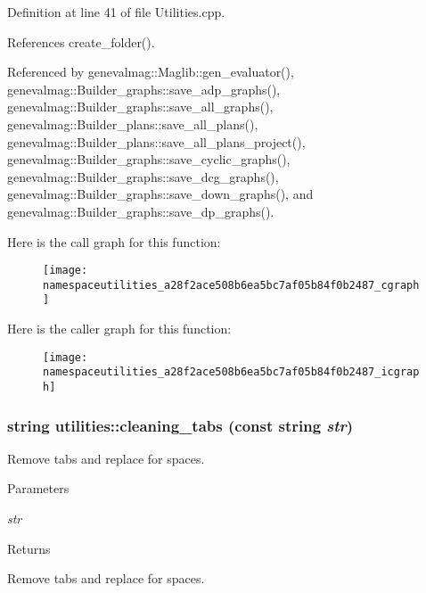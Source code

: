 Definition at line 41 of file Utilities.cpp.



References create\_\-folder().



Referenced by genevalmag::Maglib::gen\_\-evaluator(), genevalmag::Builder\_\-graphs::save\_\-adp\_\-graphs(), genevalmag::Builder\_\-graphs::save\_\-all\_\-graphs(), genevalmag::Builder\_\-plans::save\_\-all\_\-plans(), genevalmag::Builder\_\-plans::save\_\-all\_\-plans\_\-project(), genevalmag::Builder\_\-graphs::save\_\-cyclic\_\-graphs(), genevalmag::Builder\_\-graphs::save\_\-dcg\_\-graphs(), genevalmag::Builder\_\-graphs::save\_\-down\_\-graphs(), and genevalmag::Builder\_\-graphs::save\_\-dp\_\-graphs().



Here is the call graph for this function:\nopagebreak
\begin{figure}[H]
\begin{center}
\leavevmode
\texttt{[image: namespaceutilities\_a28f2ace508b6ea5bc7af05b84f0b2487\_cgraph]}
\end{center}
\end{figure}




Here is the caller graph for this function:\nopagebreak
\begin{figure}[H]
\begin{center}
\leavevmode
\texttt{[image: namespaceutilities\_a28f2ace508b6ea5bc7af05b84f0b2487\_icgraph]}
\end{center}
\end{figure}


\hypertarget{namespaceutilities_a644dfdb507e47adf60e6984d28e080fd}{
\subsubsection[{cleaning\_\-tabs}]{\setlength{\rightskip}{0pt plus 5cm}string utilities::cleaning\_\-tabs (const string {\em str})}}
\label{namespaceutilities_a644dfdb507e47adf60e6984d28e080fd}
Remove tabs and replace for spaces. 
\begin{DoxyParams}{Parameters}
\item[{\em str}]\end{DoxyParams}
\begin{DoxyReturn}{Returns}

\end{DoxyReturn}
Remove tabs and replace for spaces. 

